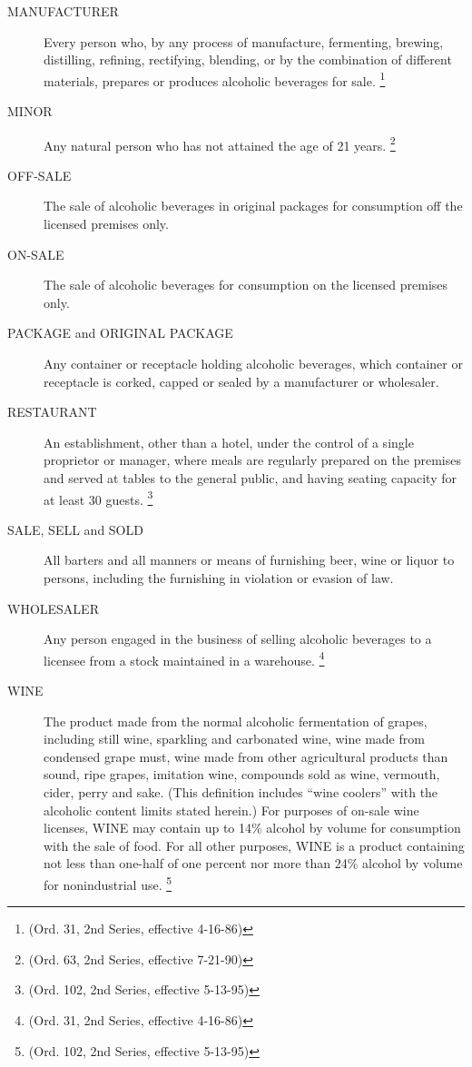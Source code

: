 \begin{description}
    \item[MANUFACTURER] Every person who, by any process of manufacture, fermenting, brewing, distilling, refining, rectifying, blending, or by the combination of different materials, prepares or produces alcoholic beverages for sale. \footnote{(Ord. 31, 2nd Series, effective 4-16-86)}
    \item[MINOR] Any natural person who has not attained the age of 21 years. \footnote{(Ord. 63, 2nd Series, effective 7-21-90)}
    \item[OFF-SALE] The sale of alcoholic beverages in original packages for consumption off the licensed premises only.
    \item[ON-SALE] The sale of alcoholic beverages for consumption on the licensed premises only.\
    \item[PACKAGE and ORIGINAL PACKAGE] Any container or receptacle holding alcoholic beverages, which container or receptacle is corked, capped or sealed by a manufacturer or wholesaler.
    \item[RESTAURANT] An establishment, other than a hotel, under the control of a single proprietor or manager, where meals are regularly prepared on the premises and served at tables to the general public, and having seating capacity for at least 30 guests. \footnote{(Ord. 102, 2nd Series, effective 5-13-95)}
    \item[SALE, SELL and SOLD] All barters and all manners or means of furnishing beer, wine or liquor to persons, including the furnishing in violation or evasion of law.
    \item[WHOLESALER] Any person engaged in the business of selling alcoholic beverages to a licensee from a stock maintained in a warehouse. \footnote{(Ord. 31, 2nd Series, effective 4-16-86)}
    \item[WINE] The product made from the normal alcoholic fermentation of grapes, including still wine, sparkling and carbonated wine, wine made from condensed grape must, wine made from other agricultural products than sound, ripe grapes, imitation wine, compounds sold as wine, vermouth, cider, perry and sake. (This definition includes “wine coolers” with the alcoholic content limits stated herein.) For purposes of on-sale wine licenses, WINE may contain up to 14\% alcohol by volume for consumption with the sale of food.  For all other purposes, WINE is a product containing not less than one-half of one percent nor more than 24\% alcohol by volume for nonindustrial use. \footnote{(Ord. 102, 2nd Series, effective 5-13-95)}
\end{description}

